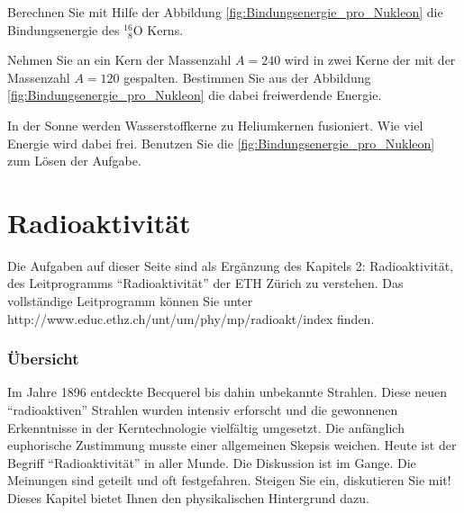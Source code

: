\documentclass[12pt,a4paper,twoside]{article}
\newcommand{\Kern}[3]{$^{#1}_{\phantom{1}#2}\text{#3}$}
\begin{document}
\begin{aufgabe}
	Berechnen Sie mit Hilfe der Abbildung \ref{fig:Bindungsenergie_pro_Nukleon} die Bindungsenergie des \Kern{16}{8}{O} Kerns.
\end{aufgabe}


\begin{aufgabe}
	Nehmen Sie an ein Kern der Massenzahl $A=240$ wird in zwei Kerne der mit der Massenzahl $A=120$ gespalten. 
	Bestimmen Sie aus der Abbildung \ref{fig:Bindungsenergie_pro_Nukleon} die dabei	freiwerdende Energie.
\end{aufgabe}

\begin{aufgabe}
	In der Sonne werden Wasserstoffkerne zu Heliumkernen fusioniert.
	Wie viel Energie wird dabei frei. Benutzen Sie die \ref{fig:Bindungsenergie_pro_Nukleon} zum Lösen der Aufgabe.
\end{aufgabe}

\newpage

\section*{Radioaktivität}

Die Aufgaben auf dieser Seite sind als Ergänzung des Kapitels 2: Radioaktivität, des Leitprogramms ``Radioaktivität'' der ETH Zürich zu verstehen.
Das vollständige Leitprogramm können Sie unter http://www.educ.ethz.ch/unt/um/phy/mp/radioakt/index finden.


\subsubsection*{Übersicht}
Im Jahre 1896 entdeckte Becquerel bis dahin unbekannte Strahlen. Diese neuen ``radioaktiven'' Strahlen 
wurden intensiv erforscht und die gewonnenen Erkenntnisse in der Kerntechnologie vielfältig umgesetzt.
Die anfänglich euphorische Zustimmung musste einer allgemeinen Skepsis weichen.
Heute ist der Begriff ``Radioaktivität'' in aller Munde. Die Diskussion ist im Gange.
Die Meinungen sind geteilt und oft festgefahren. Steigen Sie ein, diskutieren Sie mit!
Dieses Kapitel bietet Ihnen den physikalischen Hintergrund dazu.

%
\end{document}

